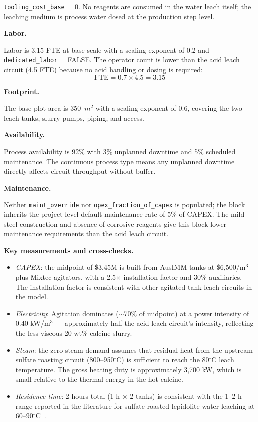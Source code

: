 \texttt{tooling\_cost\_base} = 0. No reagents are consumed in the water leach itself; the leaching medium is process water dosed at the production step level. 

\medskip
\noindent\textbf{Labor.}\quad

Labor is 3.15 FTE at base scale with a scaling exponent of 0.2 and \texttt{dedicated\_labor} = FALSE. The operator count is lower than the acid leach circuit (4.5 FTE) because no acid handling or dosing is required:
\[
	\text{FTE} = 0.7 \times 4.5 = 3.15
\]

\medskip
\noindent\textbf{Footprint.}\quad

The base plot area is 350~$\si{m^2}$ with a scaling exponent of 0.6, covering the two leach tanks, slurry pumps, piping, and access.

\medskip
\noindent\textbf{Availability.}\quad

Process availability is 92\% with 3\% unplanned downtime and 5\% scheduled maintenance. The continuous process type means any unplanned downtime directly affects circuit throughput without buffer.

\medskip
\noindent\textbf{Maintenance.}\quad

Neither \texttt{maint\_override} nor \texttt{opex\_fraction\_of\_capex} is populated; the block inherits the project-level default maintenance rate of 5\% of CAPEX. The mild steel construction and absence of corrosive reagents give this block lower maintenance requirements than the acid leach circuit.

\medskip
\noindent\textbf{Key measurements and cross-checks.}\quad

\begin{itemize}[noitemsep]
	\item \textit{CAPEX}: the midpoint of \$3.45M is built from AusIMM tanks at \$6,500/m$^3$ plus Mixtec agitators, with a 2.5$\times$ installation factor and 30\% auxiliaries. The installation factor is consistent with other agitated tank leach circuits in the model. 
	\item \textit{Electricity}: Agitation dominates ($\sim$70\% of midpoint) at a power intensity of 0.40 kW/m$^3$ --- approximately half the acid leach circuit's intensity, reflecting the less viscous 20 wt\% calcine slurry.
	\item \textit{Steam}: the zero steam demand assumes that residual heat from the upstream sulfate roasting circuit (800--950$^\circ$C) is sufficient to reach the 80$^\circ$C leach temperature. The gross heating duty is approximately 3,700 kW, which is small relative to the thermal energy in the hot calcine.
	\item \textit{Residence time}: 2 hours total (1 h $\times$ 2 tanks) is consistent with the 1--2 h range reported in the literature for sulfate-roasted lepidolite water leaching at 60--90$^\circ$C~\citep{yanExtractionLithiumLepidolite2012, dengSystematicReviewSulfate2026}.
\end{itemize}

